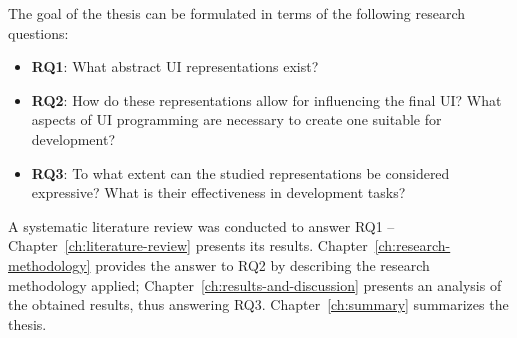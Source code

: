 
The goal of the thesis can be formulated in terms of the following research questions:
\begin{itemize}
    \item \textbf{RQ1}: What abstract UI representations exist?
    \item \textbf{RQ2}: How do these representations allow for influencing the final UI? What aspects of UI programming are necessary to create one suitable for development?
    \item \textbf{RQ3}: To what extent can the studied representations be considered expressive? What is their effectiveness in development tasks?
\end{itemize}

A systematic literature review was conducted to answer RQ1 -- Chapter~\ref{ch:literature-review} presents its results.
Chapter~\ref{ch:research-methodology} provides the answer to RQ2 by describing the research methodology applied;
Chapter~\ref{ch:results-and-discussion} presents an analysis of the obtained results, thus answering RQ3.
Chapter~\ref{ch:summary} summarizes the thesis.
